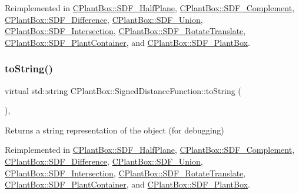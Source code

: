 Reimplemented in \hyperlink{classCPlantBox_1_1SDF__HalfPlane_a2b3edca3db93d5a80e774baecd95d952}{C\+Plant\+Box\+::\+S\+D\+F\+\_\+\+Half\+Plane}, \hyperlink{classCPlantBox_1_1SDF__Complement_a1f4d756f312a7ea6b208396a5a72e6a9}{C\+Plant\+Box\+::\+S\+D\+F\+\_\+\+Complement}, \hyperlink{classCPlantBox_1_1SDF__Difference_a3026bc983827af9842f32b1f72808ac1}{C\+Plant\+Box\+::\+S\+D\+F\+\_\+\+Difference}, \hyperlink{classCPlantBox_1_1SDF__Union_a8da2dd137f1676b7bd66cdcc9c8bef00}{C\+Plant\+Box\+::\+S\+D\+F\+\_\+\+Union}, \hyperlink{classCPlantBox_1_1SDF__Intersection_a2ed780db3881844484086de3f73543e5}{C\+Plant\+Box\+::\+S\+D\+F\+\_\+\+Intersection}, \hyperlink{classCPlantBox_1_1SDF__RotateTranslate_aa28e32386597198bb1d74361b284c1f5}{C\+Plant\+Box\+::\+S\+D\+F\+\_\+\+Rotate\+Translate}, \hyperlink{classCPlantBox_1_1SDF__PlantContainer_a952d14f86430d008b1d83fe7c047c0c2}{C\+Plant\+Box\+::\+S\+D\+F\+\_\+\+Plant\+Container}, and \hyperlink{classCPlantBox_1_1SDF__PlantBox_a0e618e485263f3006c19acbca920b78f}{C\+Plant\+Box\+::\+S\+D\+F\+\_\+\+Plant\+Box}.

\mbox{\label{classCPlantBox_1_1SignedDistanceFunction_a9f375961d9a24b06dc669ac67aa16fa6}} 
\subsubsection{\texorpdfstring{to\+String()}{toString()}}
{\footnotesize\ttfamily virtual std\+::string C\+Plant\+Box\+::\+Signed\+Distance\+Function\+::to\+String (\begin{DoxyParamCaption}{ }\end{DoxyParamCaption})\hspace{0.3cm}{\ttfamily [inline]}, {\ttfamily [virtual]}}

Returns a string representation of the object (for debugging) 

Reimplemented in \hyperlink{classCPlantBox_1_1SDF__HalfPlane_afcf91da28b3743f4b701605181564aa6}{C\+Plant\+Box\+::\+S\+D\+F\+\_\+\+Half\+Plane}, \hyperlink{classCPlantBox_1_1SDF__Complement_a8950e40cf4d3d81877205b4051186135}{C\+Plant\+Box\+::\+S\+D\+F\+\_\+\+Complement}, \hyperlink{classCPlantBox_1_1SDF__Difference_a63fc8597ea841a973ab29d7aa6cea3ca}{C\+Plant\+Box\+::\+S\+D\+F\+\_\+\+Difference}, \hyperlink{classCPlantBox_1_1SDF__Union_ae73d167fbe4edc64b4f41d2e820a0517}{C\+Plant\+Box\+::\+S\+D\+F\+\_\+\+Union}, \hyperlink{classCPlantBox_1_1SDF__Intersection_ae095150852cdaedec026b4dea1f87c40}{C\+Plant\+Box\+::\+S\+D\+F\+\_\+\+Intersection}, \hyperlink{classCPlantBox_1_1SDF__RotateTranslate_aff09310a5f6e7fb009c442b786bcd45c}{C\+Plant\+Box\+::\+S\+D\+F\+\_\+\+Rotate\+Translate}, \hyperlink{classCPlantBox_1_1SDF__PlantContainer_acbbd3751b289a98858be25c20b4f7206}{C\+Plant\+Box\+::\+S\+D\+F\+\_\+\+Plant\+Container}, and \hyperlink{classCPlantBox_1_1SDF__PlantBox_af7c53cdbb174e253799444c00503b354}{C\+Plant\+Box\+::\+S\+D\+F\+\_\+\+Plant\+Box}.

